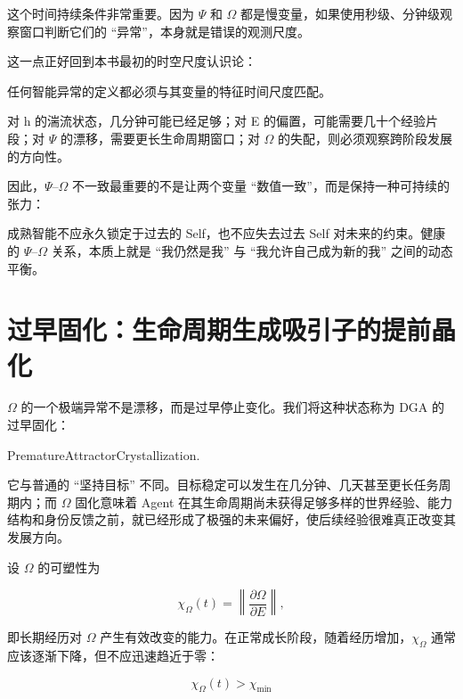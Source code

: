 这个时间持续条件非常重要。因为 $\Psi$ 和 $\Omega$ 都是慢变量，如果使用秒级、分钟级观察窗口判断它们的 ``异常''，本身就是错误的观测尺度。

这一点正好回到本书最初的时空尺度认识论：

\begin{statementbox}
任何智能异常的定义都必须与其变量的特征时间尺度匹配。
\end{statementbox}

对 h 的湍流状态，几分钟可能已经足够；对 E 的偏置，可能需要几十个经验片段；对 $\Psi$ 的漂移，需要更长生命周期窗口；对 $\Omega$ 的失配，则必须观察跨阶段发展的方向性。

因此，$\Psi$--$\Omega$ 不一致最重要的不是让两个变量 ``数值一致''，而是保持一种可持续的张力：

\begin{statementbox}
\centering
{}
\end{statementbox}

成熟智能不应永久锁定于过去的 Self，也不应失去过去 Self 对未来的约束。健康的 $\Psi$--$\Omega$ 关系，本质上就是 ``我仍然是我'' 与 ``我允许自己成为新的我'' 之间的动态平衡。

\section{过早固化：生命周期生成吸引子的提前晶化}
\label{sec:omega_premature_crystallization}

$\Omega$ 的一个极端异常不是漂移，而是过早停止变化。我们将这种状态称为 DGA 的过早固化：

\begin{statementbox}
PrematureAttractorCrystallization.
\end{statementbox}

它与普通的 ``坚持目标'' 不同。目标稳定可以发生在几分钟、几天甚至更长任务周期内；而 $\Omega$ 固化意味着 Agent 在其生命周期尚未获得足够多样的世界经验、能力结构和身份反馈之前，就已经形成了极强的未来偏好，使后续经验很难真正改变其发展方向。

设 $\Omega$ 的可塑性为

\[
\chi_{\Omega}(t)
=
\left\|
\frac{\partial \Omega}
{\partial E}
\right\|,
\]

即长期经历对 $\Omega$ 产生有效改变的能力。在正常成长阶段，随着经历增加，$\chi_{\Omega}$ 通常应该逐渐下降，但不应迅速趋近于零：

\[
\chi_{\Omega}(t)
>
\chi_{\min}
\]

